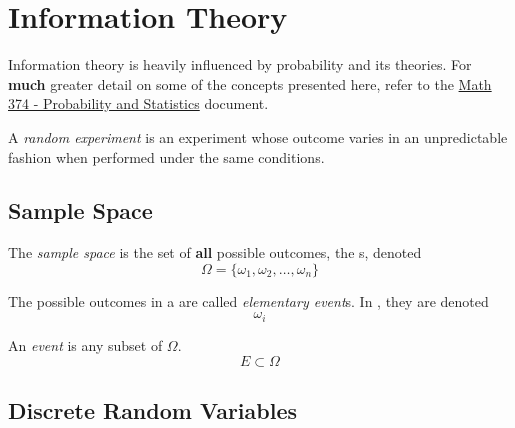\section{Information Theory}\label{sec:Information_Theory}
Information theory is heavily influenced by probability and its theories.
For \textbf{much} greater detail on some of the concepts presented here, refer to the \href{file:./Math_374-Reference_Sheet.pdf}{Math 374 - Probability and Statistics} document.

\begin{definition}\label{def:Random_Experiment}
  A \emph{random experiment} is an experiment whose outcome varies in an unpredictable fashion when performed under the same conditions.
\end{definition}

\subsection{Sample Space}\label{subsec:Sample_Space}
\begin{definition}\label{def:Sample_Space}
  The \emph{sample space} is the set of \textbf{all} possible outcomes, the s, denoted
  \begin{equation}\label{eq:Sample_Space}
    \Omega = \lbrace \omega_{1}, \omega_{2}, \ldots, \omega_{n} \rbrace
  \end{equation}
\end{definition}

\begin{definition}\label{def:Elementary_Event}
  The possible outcomes in a  are called \emph{elementary event}s.
  In , they are denoted
  \begin{equation}\label{eq:Elementary_Event}
    \omega_{i}
  \end{equation}
\end{definition}

\begin{definition}[Event]\label{def:Event}
  An \emph{event} is any subset of $\Omega$.
  \begin{equation}\label{eq:Event}
    E \subset \Omega
  \end{equation}
\end{definition}

\subsection{Discrete Random Variables}\label{subsec:Discrete_Random_Variables}
